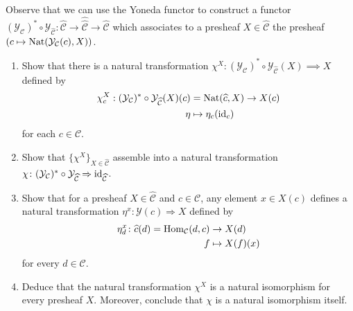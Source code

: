 \begin{Exercise}
	Observe that we can use the Yoneda functor to construct a functor $ ( \mathcal{ Y }_{ \mathcal{ C } } )^* \circ \mathcal{ Y }_{ \widehat{ \mathcal{ C }}} : \widehat{ \mathcal{ C }} \to \widehat{ \widehat { \mathcal{C }}} \to \widehat{ \mathcal{ C } }$ 
	which associates to a presheaf $ X \in \widehat{ \mathcal{ C } } $ the presheaf $ ( c \mapsto \operatorname{Nat} ( \mathcal{ Y }_{ \mathcal{ C } } (c) , X ) ) $.
	
	\begin{enumerate}[label=(\alph*)]
		\item 
		Show that there is a natural transformation $ \chi^X \colon ( \mathcal{ Y }_{ \mathcal{ C } } )^* \circ \mathcal{Y}_{\widehat{ \mathcal{ C } } } ( X ) \implies X $ defined by 
		\begin{align*}
			\chi^X_c : ( \mathcal{ Y _{ \mathcal{ C }}})^* \circ \mathcal{ Y }_{ \widehat { \mathcal{ C }}}( X ) ( c ) 
			&=
			\operatorname{Nat} ( \widehat{ c } , X ) \to X ( c ) 
			\\
			\eta 
			&\mapsto
			\eta_c ( \operatorname{id}_c )
		\end{align*}
		for each $ c \in \mathcal{ C } $.
		
		\item 
		Show that $ \{ \chi^X \}_{ X \in \widehat{ \mathcal{ C } } }$ assemble into a natural transformation $ \chi \colon ( \mathcal{ Y }_{ \mathcal{ C } } )^* \circ  \mathcal{ Y }_{\widehat{ \mathcal{ C }}} \Rightarrow \operatorname{id}_{ \widehat { \mathcal{ C  } }}$.
		
		\item 
		Show that for a presheaf $ X \in \widehat{ \mathcal{ C } } $ and $ c \in \mathcal{ C } $, any element $ x \in X ( c ) $ defines a natural transformation $ \eta^x \colon \mathcal{ Y } ( c )  \Rightarrow X $ defined by  
		\begin{align*}
			\eta_d^x \colon \widehat{ c } ( d) = \operatorname{Hom}_{ \mathcal{ C } } ( d , c ) 
			&\to 
			X ( d ) 
			\\
			f
			&\mapsto
			X ( f ) ( x ) 
		\end{align*}
		for every $ d \in \mathcal{ C } $.
		
		\item 
		Deduce that the natural transformation $ \chi^X $ is a natural isomorphism for every presheaf $ X $.
		Moreover, conclude that $ \chi $ is a natural isomorphism itself.
	\end{enumerate}
\end{Exercise}

